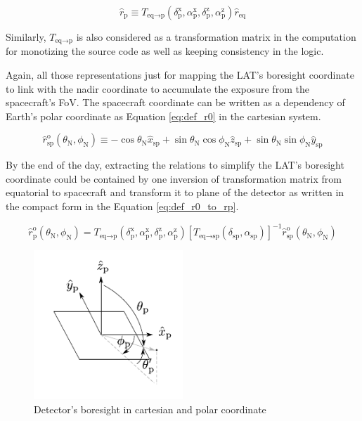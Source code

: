 \begin{equation}
    \hat{r}_\text{p} \equiv T_{\text{eq}\rightarrow\text{p}} (\delta^\text{x}_\text{p}, \alpha^\text{x}_\text{p}, \delta^\text{z}_\text{p}, \alpha^\text{z}_\text{p}) \hat{r}_\text{eq}
    \label{eq:rep_tf_eq_p}
\end{equation}

Similarly, $T_{\text{eq}\rightarrow\text{p}}$ is also considered as 
a transformation matrix in the computation for monotizing the source 
code as well as keeping consistency in the logic.

Again, all those representations just for mapping the LAT's boresight
coordinate to link with the nadir coordinate to accumulate the 
exposure from the spacecraft's FoV. The spacecraft coordinate can be 
written as a dependency of Earth's polar coordinate as Equation \ref{eq:def_r0}
in the cartesian system.

\begin{equation}
    \hat{r}^\text{o}_\text{sp} (\theta_\text{N}, \phi_\text{N}) \equiv -\cos\theta_\text{N}\hat{x}_\text{sp} + \sin\theta_\text{N}\cos\phi_\text{N}\hat{z}_\text{sp} + \sin\theta_\text{N}\sin\phi_\text{N}\hat{y}_\text{sp}
    \label{eq:def_r0}
\end{equation}

By the end of the day, extracting the relations to simplify the 
LAT's boresight coordinate could be contained by one inversion of 
transformation matrix from equatorial to spacecraft and transform it 
to plane of the detector as written in the compact form in the Equation 
\ref{eq:def_r0_to_rp}.

\begin{equation}
    \hat{r}^\text{o}_\text{p} (\theta_\text{N}, \phi_\text{N}) = T_{\text{eq}\rightarrow\text{p}} (\delta^\text{x}_\text{p}, \alpha^\text{x}_\text{p}, \delta^\text{z}_\text{p}, \alpha^\text{z}_\text{p}) \left[T_{\text{eq}\rightarrow\text{sp}} (\delta_\text{sp}, \alpha_\text{sp})\right]^{-1} \hat{r}^\text{o}_\text{sp} (\theta_\text{N}, \phi_\text{N})
    \label{eq:def_r0_to_rp}
\end{equation}

\begin{figure}[h!]
    \centering
    \includegraphics[width=0.5\textwidth]{content/methodology/figures/coord_plane}
    \caption{Detector's boresight in cartesian and polar coordinate}
    \label{fig:tf_lat_pol_car}
\end{figure}

